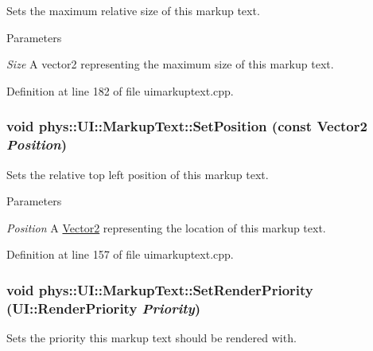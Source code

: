 Sets the maximum relative size of this markup text. 


\begin{DoxyParams}{Parameters}
\item[{\em Size}]A vector2 representing the maximum size of this markup text. \end{DoxyParams}


Definition at line 182 of file uimarkuptext.cpp.

\hypertarget{classphys_1_1UI_1_1MarkupText_aa4a71db4811506968086105e3126731c}{
\subsubsection[{SetPosition}]{\setlength{\rightskip}{0pt plus 5cm}void phys::UI::MarkupText::SetPosition (const {\bf Vector2} {\em Position})}}
\label{d7/d23/classphys_1_1UI_1_1MarkupText_aa4a71db4811506968086105e3126731c}


Sets the relative top left position of this markup text. 


\begin{DoxyParams}{Parameters}
\item[{\em Position}]A \hyperlink{classphys_1_1Vector2}{Vector2} representing the location of this markup text. \end{DoxyParams}


Definition at line 157 of file uimarkuptext.cpp.

\hypertarget{classphys_1_1UI_1_1MarkupText_a65662c49802fa5b82a04ac387b55493f}{
\subsubsection[{SetRenderPriority}]{\setlength{\rightskip}{0pt plus 5cm}void phys::UI::MarkupText::SetRenderPriority (UI::RenderPriority {\em Priority})}}
\label{d7/d23/classphys_1_1UI_1_1MarkupText_a65662c49802fa5b82a04ac387b55493f}


Sets the priority this markup text should be rendered with. 

